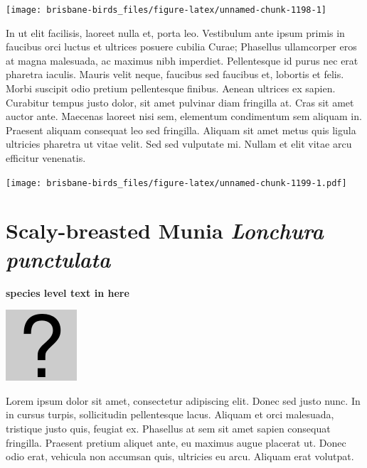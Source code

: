 \documentclass[]{book}
\let\origfigure\figure
\let\endorigfigure\endfigure
\renewenvironment{figure}[1][2] {
  \expandafter\origfigure\expandafter[H]
} {
  \endorigfigure
}
\begin{document}
\begin{figure}
\texttt{[image: brisbane-birds\_files/figure-latex/unnamed-chunk-1198-1]} \caption{insert figure caption}\label{fig:unnamed-chunk-1198}
\end{figure}

In ut elit facilisis, laoreet nulla et, porta leo. Vestibulum ante ipsum
primis in faucibus orci luctus et ultrices posuere cubilia Curae;
Phasellus ullamcorper eros at magna malesuada, ac maximus nibh
imperdiet. Pellentesque id purus nec erat pharetra iaculis. Mauris velit
neque, faucibus sed faucibus et, lobortis et felis. Morbi suscipit odio
pretium pellentesque finibus. Aenean ultrices ex sapien. Curabitur
tempus justo dolor, sit amet pulvinar diam fringilla at. Cras sit amet
auctor ante. Maecenas laoreet nisi sem, elementum condimentum sem
aliquam in. Praesent aliquam consequat leo sed fringilla. Aliquam sit
amet metus quis ligula ultricies pharetra ut vitae velit. Sed sed
vulputate mi. Nullam et elit vitae arcu efficitur venenatis.

\begin{figure}
\centering
\texttt{[image: brisbane-birds\_files/figure-latex/unnamed-chunk-1199-1.pdf]}
\caption{\label{fig:unnamed-chunk-1199}insert figure caption}
\end{figure}

\section{\texorpdfstring{Scaly-breasted Munia \emph{Lonchura
punctulata}}{Scaly-breasted Munia Lonchura punctulata}}\label{scaly-breasted-munia-lonchura-punctulata}

\textbf{species level text in here}

\begin{figure}
\centering
\includegraphics{assets/missing.png}
\caption{No image for species}
\end{figure}

Lorem ipsum dolor sit amet, consectetur adipiscing elit. Donec sed justo
nunc. In in cursus turpis, sollicitudin pellentesque lacus. Aliquam et
orci malesuada, tristique justo quis, feugiat ex. Phasellus at sem sit
amet sapien consequat fringilla. Praesent pretium aliquet ante, eu
maximus augue placerat ut. Donec odio erat, vehicula non accumsan quis,
ultricies eu arcu. Aliquam erat volutpat.
\end{document}
